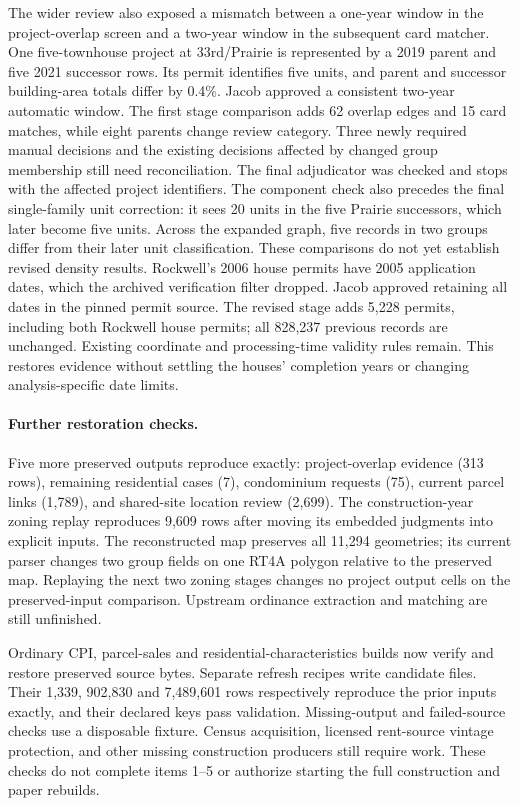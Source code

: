 The wider review also exposed a mismatch between a one-year window in the
project-overlap screen and a two-year window in the subsequent card matcher.
One five-townhouse project at 33rd/Prairie is represented by a 2019 parent and
five 2021 successor rows. Its permit identifies five units, and parent and successor building-area totals
differ by 0.4\%. Jacob approved a consistent two-year automatic window. The
first stage comparison adds 62 overlap edges and 15 card matches, while eight
parents change review category. Three newly required manual decisions and the
existing decisions affected by changed group membership still need reconciliation.
The final adjudicator was checked and stops with the affected project identifiers.
The component check also precedes the final single-family unit correction:
it sees 20 units in the five Prairie successors, which later become five units.
Across the expanded graph, five records in two groups differ from their later
unit classification. These comparisons do not yet establish revised density results.
Rockwell's 2006 house permits have 2005 application dates, which the archived
verification filter dropped. Jacob approved retaining all dates in the pinned
permit source. The revised stage adds 5,228 permits, including both Rockwell
house permits; all 828,237 previous records are unchanged. Existing coordinate
and processing-time validity rules remain. This restores evidence without
settling the houses' completion years or changing analysis-specific date limits.

\paragraph{Further restoration checks.}
Five more preserved outputs reproduce exactly: project-overlap evidence (313
rows), remaining residential cases (7), condominium requests (75), current parcel
links (1,789), and shared-site location review (2,699). The construction-year
zoning replay reproduces 9,609 rows after moving its embedded judgments into
explicit inputs. The reconstructed map preserves all 11,294 geometries; its
current parser changes two group fields on one RT4A polygon relative to the
preserved map. Replaying the next two zoning stages changes no project output
cells on the preserved-input comparison. Upstream ordinance extraction and
matching are still unfinished.

Ordinary CPI, parcel-sales and residential-characteristics builds now verify and
restore preserved source bytes. Separate refresh recipes write candidate files.
Their 1,339, 902,830 and 7,489,601 rows respectively reproduce the prior inputs
exactly, and their declared keys pass validation. Missing-output and failed-source
checks use a disposable fixture. Census acquisition, licensed rent-source vintage
protection, and other missing construction producers still require work. These
checks do not complete items 1--5 or authorize starting the full construction
and paper rebuilds.

